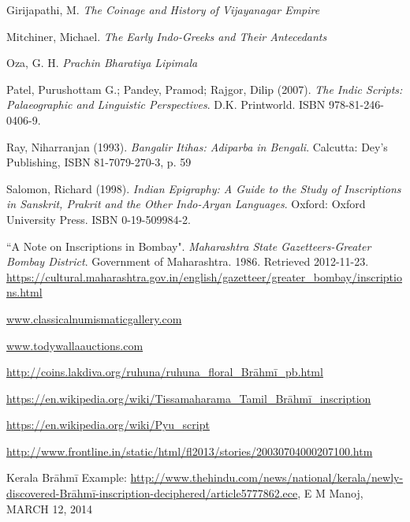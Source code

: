 \begin{thebibliography}{99}
\itemsep=2pt
 Girijapathi, M. \textit{The Coinage and History of Vijayanagar Empire}

  Mitchiner, Michael. \textit{The Early Indo-Greeks and Their Antecedants}

  Oza, G. H. \textit{Prachin Bharatiya Lipimala}

  Patel, Purushottam G.; Pandey, Pramod; Rajgor, Dilip (2007). \textit{The Indic Scripts: Palaeographic and Linguistic Perspectives}. D.K. Printworld. ISBN 978-81-246-0406-9.

  Ray, Niharranjan (1993). \textit{Bangalir Itihas: Adiparba in Bengali}. Calcutta: Dey's Publishing, ISBN 81-7079-270-3, p. 59

  Salomon, Richard (1998). \textit{Indian Epigraphy: A Guide to the Study of Inscriptions in Sanskrit, Prakrit and the Other Indo-Aryan Languages}. Oxford: Oxford University Press. ISBN 0-19-509984-2.

  “A Note on Inscriptions in Bombay". \textit{Maharashtra State Gazetteers-Greater Bombay District}. Government of Maharashtra. 1986. Retrieved 2012-11-23. \url{https://cultural.maharashtra.gov.in/english/gazetteer/greater_bombay/inscriptions.html}

  \url{www.classicalnumismaticgallery.com}

  \url{www.todywallaauctions.com}

  \url{http://coins.lakdiva.org/ruhuna/ruhuna_floral_Brāhmī_pb.html}

  \url{https://en.wikipedia.org/wiki/Tissamaharama_Tamil_Brāhmī_inscription}

  \url{https://en.wikipedia.org/wiki/Pyu_script}

  \url{http://www.frontline.in/static/html/fl2013/stories/20030704000207100.htm}

  Kerala Brāhmī Example: \url{http://www.thehindu.com/news/national/kerala/newly-discovered-Brāhmī-inscription-deciphered/article5777862.ece}, E M Manoj, MARCH 12, 2014

 \end{thebibliography}

